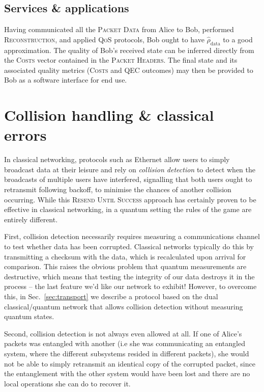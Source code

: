 \documentclass[aps, rmp, twocolumn, amsmath, amssymb, nofootinbib, superscriptaddress, longbibliography, floatfix, table-of-contents, eqsecnum]{revtex4-1}
\begin{document}
%
%

\subsection{Services \& applications} 

Having communicated all the \textsc{Packet Data} from Alice to Bob, performed \textsc{Reconstruction}, and applied \textsc{QoS} protocols, Bob ought to have $\hat\rho_\text{data}$ to a good approximation. The quality of Bob's received state can be inferred directly from the \textsc{Costs} vector contained in the \textsc{Packet Headers}. The final state and its associated quality metrics (\textsc{Costs} and QEC outcomes) may then be provided to Bob as a software interface for end use.

%
%

\section{Collision handling \& classical errors} \label{sec:collision}  

In classical networking, protocols such as Ethernet allow users to simply broadcast data at their leisure and rely on \textit{collision detection} to detect when the broadcasts of multiple users have interfered, signalling that both users ought to retransmit following backoff, to minimise the chances of another collision occurring. While this \textsc{Resend Until Success} approach has certainly proven to be effective in classical networking, in a quantum setting the rules of the game are entirely different.

First, collision detection necessarily requires measuring a communications channel to test whether data has been corrupted. Classical networks typically do this by transmitting a checksum with the data, which is recalculated upon arrival for comparison. This raises the obvious problem that quantum measurements are destructive, which means that testing the integrity of our data destroys it in the process -- the last feature we'd like our network to exhibit! However, to overcome this, in Sec.~\ref{sec:transport} we describe a protocol based on the dual classical/quantum network that allows collision detection without measuring quantum states.

Second, collision detection is not always even allowed at all. If one of Alice's packets was entangled with another (i.e she was communicating an entangled system, where the different subsystems resided in different packets), she would not be able to simply retransmit an identical copy of the corrupted packet, since the entanglement with the other system would have been lost and there are no local operations she can do to recover it.
\end{document}
